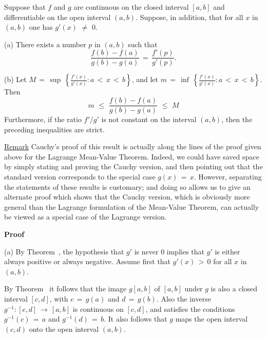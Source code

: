 \V

        Suppose that $f$ and $g$ are continuous on the closed interval $[a,b]$ and differentiable on the open interval $(a,b)$.
    Suppose, in addition, that for all $x$ in $(a,b)$ one has $g'(x) \,\,{\neq}\,\, 0$.

\V

        (a) There exists a number $p$ in $(a,b)$ such that
        \begin{equation}
        \label{EqnE.110}
        \frac{f(b)-f(a)}{g(b)-g(a)} \,=\, \frac{f'(p)}{g'(p)}.
        \end{equation}

\V


        (b) Let $M \,=\, {\sup}\,\left\{{\displaystyle \frac{f'(x)}{g'(x)}: a\,<\,x\,<\,b}\right\}$,
    and let $m \,=\, {\inf}\,\left\{{\displaystyle \frac{f'(x)}{g'(x)}: a\,<\,x\,<\,b}\right\}$. Then
        \begin{displaymath}
        m\,\,{\leq}\,\,\frac{f(b)-f(a)}{g(b)-g(a)}\,\,{\leq}\,\,M
        \end{displaymath}
    Furthermore, if the ratio $f'/g'$ is not constant on the interval $(a,b)$, then the preceding inequalities are strict.

\V

        \underline{Remark} Cauchy's proof of this result is actually along the lines of the proof given above for the Lagrange Mean-Value Theorem.
    Indeed, we could have saved space by simply stating and proving the Cauchy version,
    and then pointing out that the standard version corresponds to the special case $g(x) \,=\, x$.
        However, separating the statements of these results is customary; and doing so allows us
    to give an alternate proof which shows that the Cauchy version, which is obviously more general than the Lagrange formulation of the Mean-Value Theorem, 
    can actually be viewed as a special case of the Lagrange version.

\V

        {\bf Proof}

\V

        (a) By Theorem~, the hypothesis that $g'$ is never $0$ implies that $g'$ is either always positive or always negative.
    Assume first that $g'(x)\,>\,0$ for all $x$ in $(a,b)$.

        By Theorem~ it follows that the image $g[a,b]$ of $[a,b]$ under $g$ is also a closed interval $[c,d]$, with $c \,=\, g(a)$ and $d \,=\, g(b)$.
    Also the inverse $g^{-1}:[c,d] \,{\rightarrow}\, [a,b]$ is continuous on $[c,d]$, and satisfies the conditions $g^{-1}(c) \,=\, a$ and $g^{-1}(d) \,=\, b$.
    It also follows that $g$ maps the open interval $(c,d)$ onto the open interval $(a,b)$.

